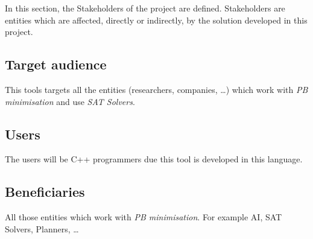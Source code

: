 In this section, the Stakeholders of the project are defined. Stakeholders are entities which are affected, directly or indirectly, by the solution developed in this project. 
\subsection{Target audience}
This tools targets all the entities (researchers, companies, \ldots) which work with \emph{PB minimisation} and use \emph{SAT Solvers}.
\subsection{Users}
The users will be C++ programmers due this tool is developed in this language.
\subsection{Beneficiaries}
All those entities which work with \emph{PB minimisation}. For example AI, SAT Solvers, Planners, \ldots